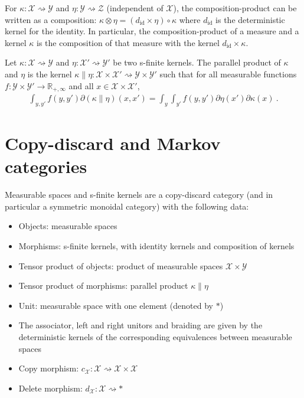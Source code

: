 For $\kappa : \mathcal X \rightsquigarrow \mathcal Y$ and $\eta : \mathcal Y \rightsquigarrow \mathcal Z$ (independent of $\mathcal X$), the composition-product can be written as a composition: $\kappa \otimes \eta = (d_{\text{id}} \times \eta) \circ \kappa$ where $d_{\text{id}}$ is the deterministic kernel for the identity.
In particular, the composition-product of a measure and a kernel $\kappa$ is the composition of that measure with the kernel $d_{\text{id}} \times \kappa$.

\begin{definition}
  \label{def:kernel_parallel_prod}
  \mathlibok
  Let $\kappa : \mathcal X \rightsquigarrow \mathcal Y$ and $\eta : \mathcal X' \rightsquigarrow \mathcal Y'$ be two s-finite kernels.
  The parallel product of $\kappa$ and $\eta$ is the kernel $\kappa \parallel \eta : \mathcal X \times \mathcal X' \rightsquigarrow \mathcal Y \times \mathcal Y'$ such that for all measurable functions $f : \mathcal Y \times \mathcal Y' \to \mathbb{R}_{+,\infty}$ and all $x \in \mathcal X \times \mathcal X'$,
  \begin{align*}
  \int_{y,y'} f(y,y') \partial(\kappa \parallel \eta)(x,x') = \int_y \int_{y'} f(y,y') \partial\eta(x') \partial\kappa(x) \: .
  \end{align*}
\end{definition}



\section{Copy-discard and Markov categories}

Measurable spaces and s-finite kernels are a copy-discard category (and in particular a symmetric monoidal category) with the following data:
\begin{itemize}
  \item Objects: measurable spaces
  \item Morphisms: s-finite kernels, with identity kernels and composition of kernels
  \item Tensor product of objects: product of measurable spaces $\mathcal X \times \mathcal Y$
  \item Tensor product of morphisms: parallel product $\kappa \parallel \eta$ 
  \item Unit: measurable space with one element (denoted by $*$)
  \item The associator, left and right unitors and braiding are given by the deterministic kernels of the corresponding equivalences between measurable spaces
  \item Copy morphism: $c_{\mathcal X}: \mathcal X \rightsquigarrow \mathcal X \times \mathcal X$
  \item Delete morphism: $d_{\mathcal X} : \mathcal X \rightsquigarrow *$
\end{itemize}

